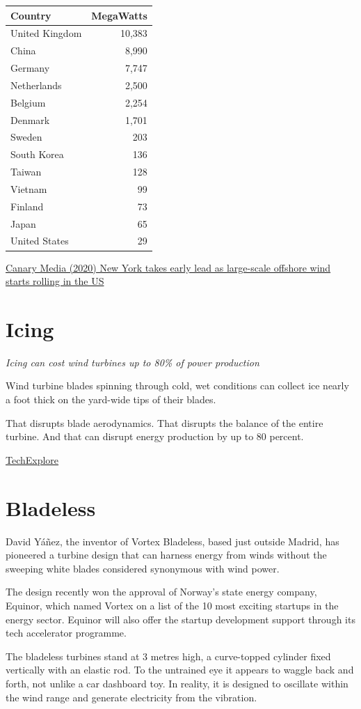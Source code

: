 \documentclass[
]{book}
\begin{document}
\begin{longtable}[]{@{}lr@{}}
\toprule
Country & MegaWatts\tabularnewline
\midrule
\endhead
United Kingdom & 10,383\tabularnewline
China & 8,990\tabularnewline
Germany & 7,747\tabularnewline
Netherlands & 2,500\tabularnewline
Belgium & 2,254\tabularnewline
Denmark & 1,701\tabularnewline
Sweden & 203\tabularnewline
South Korea & 136\tabularnewline
Taiwan & 128\tabularnewline
Vietnam & 99\tabularnewline
Finland & 73\tabularnewline
Japan & 65\tabularnewline
United States & 29\tabularnewline
\bottomrule
\end{longtable}

\href{https://www.canarymedia.com/articles/wind/new-york-takes-early-lead-as-large-scale-offshore-wind-starts-rolling-in-the-us}{Canary Media (2020) New York takes early lead as large-scale offshore wind starts rolling in the US}

\hypertarget{icing}{%
\section{Icing}\label{icing}}

\emph{Icing can cost wind turbines up to 80\% of power production}

Wind turbine blades spinning through cold, wet conditions can collect ice nearly a foot thick on the yard-wide tips of their blades.

That disrupts blade aerodynamics. That disrupts the balance of the entire turbine. And that can disrupt energy production by up to 80 percent.

\href{https://techxplore.com/news/2021-03-field-icing-turbines-power-production.html}{TechExplore}

\hypertarget{bladeless}{%
\section{Bladeless}\label{bladeless}}

David Yáñez, the inventor of Vortex Bladeless, based just outside Madrid,
has pioneered a turbine design that can harness energy from winds
without the sweeping white blades considered synonymous with wind power.

The design recently won the approval of Norway's state energy company, Equinor,
which named Vortex on a list of the 10 most exciting startups in the energy sector.
Equinor will also offer the startup development support through its tech accelerator programme.

The bladeless turbines stand at 3 metres high,
a curve-topped cylinder fixed vertically with an elastic rod.
To the untrained eye it appears to waggle back and forth,
not unlike a car dashboard toy.
In reality, it is designed to oscillate within the wind range and
generate electricity from the vibration.
\end{document}
